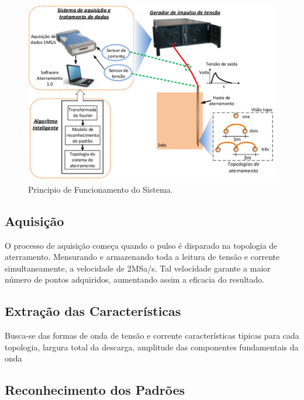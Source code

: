 \documentclass[a4paper, 10pt]{article}
\begin{document}
\begin{figure}[!h]
        \caption{\label{fig_principio_funcionamento}Principio de Funcionamento do Sistema.}
	    \begin{center}
            \includegraphics[scale=0.5]{../fotos/principio/principio_de_funcionamento_corte.pdf}
	    \end{center}
\end{figure}


\subsection{Aquisição}

O processo de aquisição começa quando o pulso é disparado na topologia de aterramento.
Mensurando e armazenando toda a leitura de tensão e corrente simultaneamente, a velocidade
de 2MSa/s. Tal velocidade garante a maior número de pontos adquiridos, aumentando 
assim a eficacia do resultado.


\subsection{Extração das Características}

Busca-se das formas de onda de tensão e corrente características tipicas para 
cada topologia, largura total da descarga, amplitude das componentes fundamentais
da onda


\subsection{Reconhecimento dos Padrões}
\end{document}
